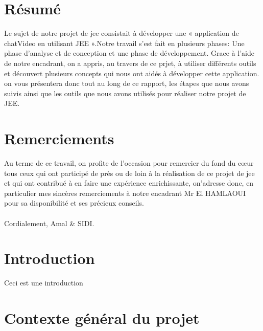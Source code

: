\documentclass[oneside,12pt,a4paper]{book}
\renewcommand{\chaptermark}[1]{\markboth{\textit{#1}}{}}
\begin{document}
\newpage

\chapter*{Résumé}
\thispagestyle{empty}

Le sujet de notre projet de jee consistait à développer une « application de chatVideo en utilisant JEE ».Notre travail s’est fait en plusieurs phases: Une phase d’analyse et de conception et une phase de développement.
Grace à l’aide de notre encadrant, on a appris, au travers de ce prjet, à utiliser différents outils et découvert plusieurs concepts qui nous ont aidés à développer cette application.
on vous présentera donc tout au long de ce rapport, les étapes que nous avons suivis
ainsi que les outils que nous avons utilisés pour réaliser notre projet de JEE.

\chapter*{Remerciements}
\thispagestyle{empty}

Au terme de ce travail, on profite de l’occasion pour remercier du fond du cœur tous ceux qui ont participé de près ou de loin à la réalisation de ce projet de jee et qui ont contribué à en faire une expérience enrichissante, on’adresse donc, en particulier mes sincères remerciements à notre encadrant Mr El HAMLAOUI pour sa disponibilité et ses précieux conseils.
\\
\\
Cordialement, Amal \& SIDI.%

\renewcommand{\contentsname}{Sommaire}
\renewcommand\thepage{}
\tableofcontents
\thispagestyle{empty}

\mainmatter
\chapter*{Introduction}
\chaptermark{Introduction}



Ceci est une introduction

\chapter{Contexte général du projet}
\end{document}
